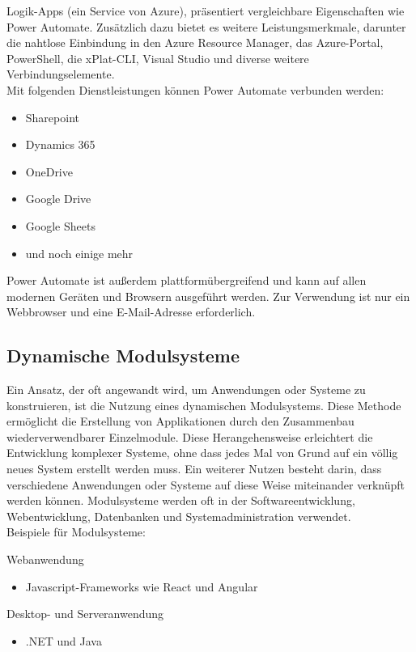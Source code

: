Logik-Apps (ein Service von Azure), 
präsentiert vergleichbare Eigenschaften wie Power Automate. Zusätzlich dazu 
bietet es weitere Leistungsmerkmale, darunter die nahtlose Einbindung in den 
Azure Resource Manager, das Azure-Portal, PowerShell, die xPlat-CLI, Visual Studio und 
diverse weitere Verbindungselemente.\\

Mit folgenden Dienstleistungen können Power Automate verbunden werden:

\begin{itemize}
    \item Sharepoint
    \item Dynamics 365
    \item OneDrive
    \item Google Drive
    \item Google Sheets
    \item und noch einige mehr
\end{itemize}

Power Automate ist außerdem plattformübergreifend und kann auf allen modernen Geräten und Browsern
ausgeführt werden. Zur Verwendung ist nur ein Webbrowser und eine E-Mail-Adresse erforderlich.

\newpage
\subsection*{Dynamische Modulsysteme}

Ein Ansatz, der oft angewandt wird, um Anwendungen oder Systeme zu konstruieren, 
ist die Nutzung eines dynamischen Modulsystems. Diese Methode ermöglicht die Erstellung 
von Applikationen durch den Zusammenbau wiederverwendbarer Einzelmodule. 
Diese Herangehensweise erleichtert die Entwicklung komplexer Systeme, ohne dass jedes 
Mal von Grund auf ein völlig neues System erstellt werden muss. Ein weiterer Nutzen besteht darin, 
dass verschiedene Anwendungen oder Systeme auf diese Weise miteinander verknüpft werden können.
Modulsysteme werden oft in der Softwareentwicklung, Webentwicklung, 
Datenbanken und Systemadministration verwendet.\\

Beispiele für Modulsysteme:

Webanwendung
\begin{itemize}
    \item Javascript-Frameworks wie React und Angular
\end{itemize}

Desktop- und Serveranwendung
\begin{itemize}
    \item .NET und Java
\end{itemize}

